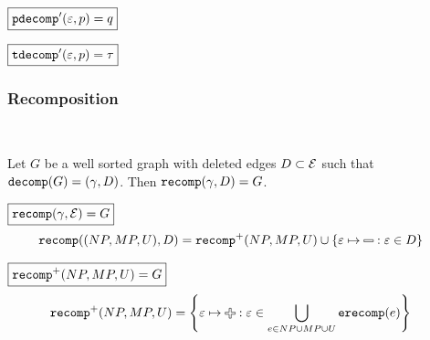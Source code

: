 \noindent $\boxed{\pdecompPrime{\e}{p} = q}$
%
\figureDecompositionDefPdecompPrime

\noindent $\boxed{\tdecompPrime{\e}{p} = \tau}$
%
\figureDecompositionDefTdecompPrime%


\subsubsection{Recomposition}\hspace*{\fill} \\

\begin{theorem}
  Let $G$ be a well sorted graph with deleted edges $D \subset \E$
  such that $\decomp{G} = (\Grove, D)$. Then $\recomp{\Grove}{D} = G$.
\end{theorem}

\noindent $\boxed{\recomp{\Grove}{\E} = G}$
%
\begin{align*}
  \recomp{(NP, MP, U)}{D} &= \recompPlus{NP, MP, U} \cup \SetOf{\e \mapsto \Minus \SuchThat{\e \in D}}
\end{align*}

\noindent $\boxed{\recompPlus{NP, MP, U} = G}$
%
\begin{align*}
  \recompPlus{NP, MP, U} &= \SetOf{\e \mapsto \Plus \SuchThat{\e \in \bigcup_{e \in NP \cup MP \cup U} \erecomp{e}}}
\end{align*}

